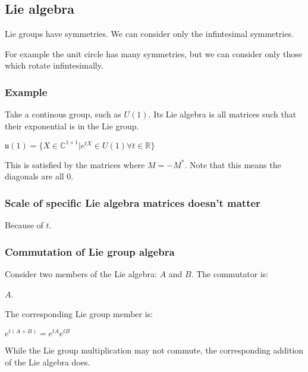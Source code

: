 
\subsection{Lie algebra}

Lie groups have symmetries. We can consider only the infintesimal symmetries.

For example the unit circle has many symmetries, but we can consider only those which rotate infintesimally.

\subsubsection{Example}

Take a continous group, such as \(U(1)\). Its Lie algebra is all matrices such that their exponential is in the Lie group.

\(\mathfrak{u}(1)=\{X\in \mathbb {C}^{1\times 1}|e^{tX}\in U(1) \forall t\in \mathbb{R}\}\)

This is satisfied by the matrices where \(M=-M^*\). Note that this means the diagonals are all \(0\).

\subsubsection{Scale of specific Lie algebra matrices doesn't matter}

Because of \(t\).

\subsubsection{Commutation of Lie group algebra}

Consider two members of the Lie algebra: \(A\) and \(B\). The commutator is:

\(A\).

The corresponding Lie group member is:

\(e^{t(A+B)}=e^{tA}e^{tB}\)

While the Lie group multiplication may not commute, the corresponding addition of the Lie algebra does.

